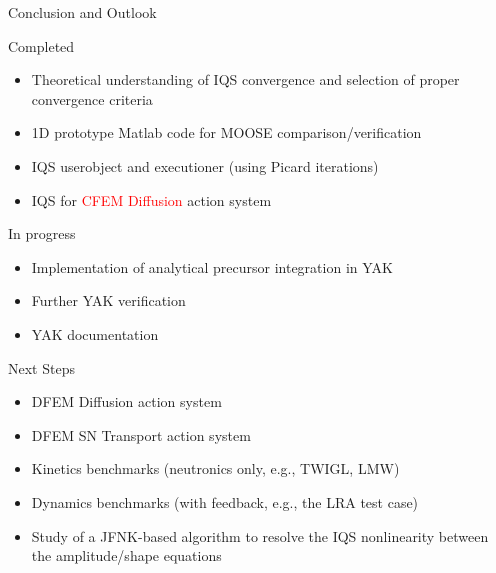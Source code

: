\documentclass[8pt]{beamer}
\newcommand{\bi}{\begin{itemize}}
\newcommand{\ei}{\end{itemize}}
\newcommand{\tcr}[1]{\textcolor{red}{#1}}
\begin{document}
\begin{frame}{Conclusion and Outlook}

\begin{block}{Completed}
\bi
\item Theoretical understanding of IQS convergence and selection of proper convergence criteria
\item 1D prototype Matlab code for MOOSE comparison/verification
\item IQS userobject and executioner (using Picard iterations)
\item IQS for \tcr{CFEM Diffusion} action system
\ei
\end{block}

\begin{block}{In progress}
\bi
\item Implementation of analytical precursor integration in YAK
\item Further YAK verification
\item YAK documentation
\ei
\end{block}
\begin{block}{Next Steps}
\bi
\item DFEM Diffusion action system
\item DFEM SN Transport action system
\item Kinetics benchmarks (neutronics only, e.g., TWIGL, LMW)
\item Dynamics benchmarks (with feedback, e.g., the LRA test case)
\item Study of a JFNK-based algorithm to resolve the IQS nonlinearity between the amplitude/shape equations
\ei
\end{block}

\end{frame}
\end{document}

